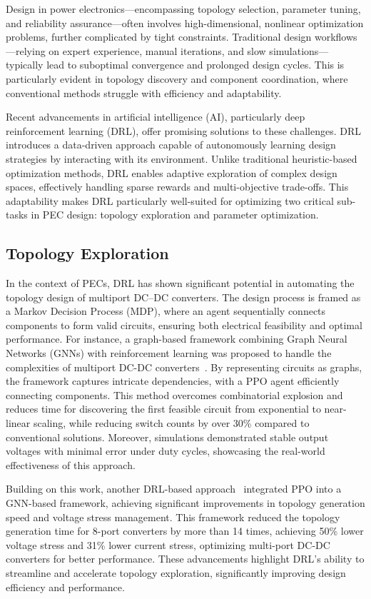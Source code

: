 Design in power electronics—encompassing topology selection, parameter tuning, and reliability assurance—often involves high-dimensional, nonlinear optimization problems, further complicated by tight constraints. Traditional design workflows—relying on expert experience, manual iterations, and slow simulations—typically lead to suboptimal convergence and prolonged design cycles. This is particularly evident in topology discovery and component coordination, where conventional methods struggle with efficiency and adaptability.

Recent advancements in artificial intelligence (AI), particularly deep reinforcement learning (DRL), offer promising solutions to these challenges. DRL introduces a data-driven approach capable of autonomously learning design strategies by interacting with its environment. Unlike traditional heuristic-based optimization methods, DRL enables adaptive exploration of complex design spaces, effectively handling sparse rewards and multi-objective trade-offs. This adaptability makes DRL particularly well-suited for optimizing two critical sub-tasks in PEC design: topology exploration and parameter optimization.

\subsection{Topology Exploration}
\label{sec:topo_explore}

In the context of PECs, DRL has shown significant potential in automating the topology design of multiport DC–DC converters. The design process is framed as a Markov Decision Process (MDP), where an agent sequentially connects components to form valid circuits, ensuring both electrical feasibility and optimal performance. For instance, a graph-based framework combining Graph Neural Networks (GNNs) with reinforcement learning was proposed to handle the complexities of multiport DC-DC converters~\cite{liang2022learning}. By representing circuits as graphs, the framework captures intricate dependencies, with a PPO agent efficiently connecting components. This method overcomes combinatorial explosion and reduces time for discovering the first feasible circuit from exponential to near-linear scaling, while reducing switch counts by over 30\% compared to conventional solutions. Moreover, simulations demonstrated stable output voltages with minimal error under duty cycles, showcasing the real-world effectiveness of this approach.

Building on this work, another DRL-based approach~\cite{dong2023topology} integrated PPO into a GNN-based framework, achieving significant improvements in topology generation speed and voltage stress management. This framework reduced the topology generation time for 8-port converters by more than 14 times, achieving 50\% lower voltage stress and 31\% lower current stress, optimizing multi-port DC-DC converters for better performance. These advancements highlight DRL's ability to streamline and accelerate topology exploration, significantly improving design efficiency and performance.

